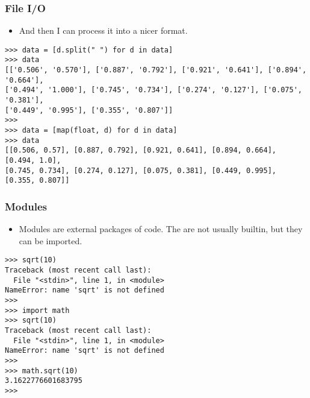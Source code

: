 \documentclass[handout]{beamer}
\numberwithin{equation}{section}
\begin{document}
\begin{frame}[fragile]
\frametitle{File I/O}

\begin{itemize}
\item And then I can process it into a nicer format.
\end{itemize}

\begin{lstlisting}[name=ex]
>>> data = [d.split(" ") for d in data]
>>> data
[['0.506', '0.570'], ['0.887', '0.792'], ['0.921', '0.641'], ['0.894', '0.664'], 
['0.494', '1.000'], ['0.745', '0.734'], ['0.274', '0.127'], ['0.075', '0.381'], 
['0.449', '0.995'], ['0.355', '0.807']]
>>> 
>>> data = [map(float, d) for d in data]
>>> data
[[0.506, 0.57], [0.887, 0.792], [0.921, 0.641], [0.894, 0.664], [0.494, 1.0], 
[0.745, 0.734], [0.274, 0.127], [0.075, 0.381], [0.449, 0.995], [0.355, 0.807]]
\end{lstlisting}
\end{frame}


\begin{frame}[fragile]
\frametitle{Modules}

\begin{itemize}
\item Modules are external packages of code. The are not usually builtin, but  they can be imported. 
\end{itemize}

\begin{lstlisting}[name=ex]
>>> sqrt(10)
Traceback (most recent call last):
  File "<stdin>", line 1, in <module>
NameError: name 'sqrt' is not defined
>>> 
>>> import math
>>> sqrt(10)
Traceback (most recent call last):
  File "<stdin>", line 1, in <module>
NameError: name 'sqrt' is not defined
>>> 
>>> math.sqrt(10)
3.1622776601683795
>>> 
\end{lstlisting}
\end{frame}
\end{document}
